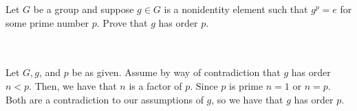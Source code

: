 Let $G$ be a group and suppose $g\in G$ is a nonidentity element such that $g^p=e$ for some prime number
$p$. Prove that $g$ has order $p$.\\\\

\begin{solution}\renewcommand{\qedsymbol}{}\ \\
    Let $G, g$, and $p$ be as given. Assume by way of contradiction that $g$ has order $n<p$. Then, we
    have that $n$ is a factor of $p$. Since $p$ is prime $n=1$ or $n=p$. Both are a contradiction to our
    assumptions of $g$, so we have that $g$ has order $p$.

\end{solution}